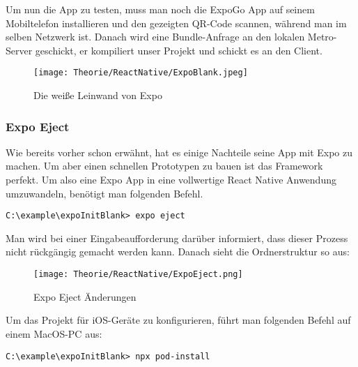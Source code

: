Um nun die App zu testen, muss man noch die ExpoGo App auf seinem Mobiltelefon installieren und den
gezeigten QR-Code scannen, während man im selben Netzwerk ist. Danach wird eine Bundle-Anfrage an
den lokalen Metro-Server geschickt, er kompiliert unser Projekt und schickt es an den Client.

\begin{figure}[H]
  \begin{center}
    \texttt{[image: Theorie/ReactNative/ExpoBlank.jpeg]}
    \caption{Die weiße Leinwand von Expo}
  \end{center}
\end{figure}

\subsubsection{Expo Eject}
Wie bereits vorher schon erwähnt, hat es einige Nachteile seine App mit Expo zu machen. Um aber
einen schnellen Prototypen zu bauen ist das Framework perfekt. Um also eine Expo App in eine
vollwertige React Native Anwendung umzuwandeln, benötigt man folgenden Befehl.

\begin{lstlisting}
C:\example\expoInitBlank> expo eject
\end{lstlisting}

Man wird bei einer Eingabeaufforderung darüber informiert, dass dieser Prozess nicht rückgängig
gemacht werden kann. Danach sieht die Ordnerstruktur so aus:

\begin{figure}[H]
  \begin{center}
    \texttt{[image: Theorie/ReactNative/ExpoEject.png]}
    \caption{Expo Eject Änderungen}
  \end{center}
\end{figure}

Um das Projekt für iOS-Geräte zu konfigurieren, führt man folgenden Befehl auf einem MacOS-PC aus:

\begin{lstlisting}
C:\example\expoInitBlank> npx pod-install
\end{lstlisting}

